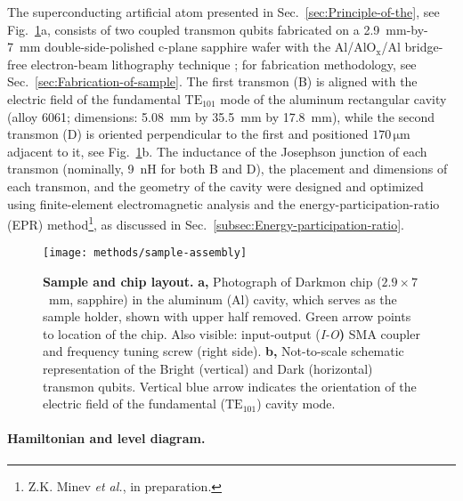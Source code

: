 The superconducting artificial atom presented in Sec.~\ref{sec:Principle-of-the},
see Fig.~\ref{fig:Sample-design-assembly}a, consists of two coupled
transmon qubits \citep{Koch2007,Schreier2008-transmon,Paik2011} fabricated
on a 2.9~mm-by-7~mm double-side-polished c-plane sapphire wafer
with the Al/Al$\text{O}_{\text{x}}$/Al bridge-free electron-beam
lithography technique \citep{Lecocq2011-bridge-free,Rigetti2009};
for fabrication methodology, see Sec.~\ref{sec:Fabrication-of-sample}.
The first transmon (B) is aligned with the electric field of the fundamental
$\mathrm{TE}_{\mathrm{101}}$ mode of the aluminum rectangular cavity
(alloy 6061; dimensions: 5.08~mm by 35.5~mm by 17.8~mm), while
the second transmon (D) is oriented perpendicular to the first and
positioned $170\,\mathrm{\mu m}$ adjacent to it, see Fig.~\ref{fig:Sample-design-assembly}b.
The inductance of the Josephson junction of each transmon (nominally,
9~nH for both B and D), the placement and dimensions of each transmon,
and the geometry of the cavity were designed and optimized using finite-element
electromagnetic analysis and the energy-participation-ratio (EPR)
method\footnote{Z.K. Minev \emph{et al.}, in preparation.}, as discussed
in Sec.~\ref{subsec:Energy-participation-ratio}. 

\begin{figure}
\centering{}\texttt{[image: methods/sample-assembly]}
\caption[Sample and chip layout]{\textbf{Sample and chip layout.\label{fig:Sample-design-assembly}}
\textbf{a,} Photograph of Darkmon chip ($2.9\times7$~mm, sapphire)
in the aluminum (Al) cavity, which serves as the sample holder, shown
with upper half removed. Green arrow points to location of the chip.
Also visible: input-output (\emph{I-O}\textbf{) }SMA coupler and frequency
tuning screw (right side). \textbf{ b, }Not-to-scale schematic representation
of the Bright (vertical) and Dark (horizontal) transmon qubits. Vertical
blue arrow indicates the orientation of the electric field of the
fundamental ($\mathrm{TE}_{\mathrm{101}}$) cavity mode. }
\end{figure}


\paragraph{Hamiltonian and level diagram.}

